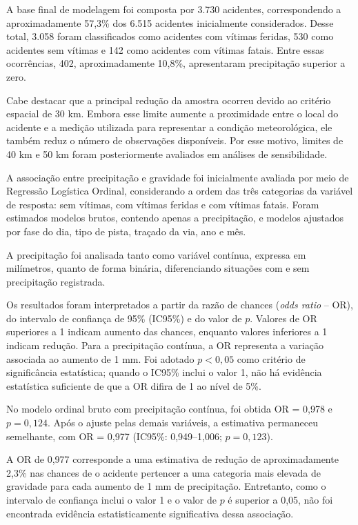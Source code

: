 \documentclass[12pt]{article}
\begin{document}
A base final de modelagem foi composta por 3.730 acidentes, correspondendo
a aproximadamente 57,3\% dos 6.515 acidentes inicialmente considerados.
Desse total, 3.058 foram classificados como acidentes com vítimas feridas,
530 como acidentes sem vítimas e 142 como acidentes com vítimas fatais.
Entre essas ocorrências, 402, aproximadamente 10,8\%, apresentaram
precipitação superior a zero.

Cabe destacar que a principal redução da amostra ocorreu devido ao critério
espacial de 30 km. Embora esse limite aumente a proximidade entre o local
do acidente e a medição utilizada para representar a condição meteorológica,
ele também reduz o número de observações disponíveis. Por esse motivo,
limites de 40 km e 50 km foram posteriormente avaliados em análises de
sensibilidade.

A associação entre precipitação e gravidade foi inicialmente avaliada por
meio de Regressão Logística Ordinal, considerando a ordem das três categorias
da variável de resposta: sem vítimas, com vítimas feridas e com vítimas
fatais. Foram estimados modelos brutos, contendo apenas a precipitação, e
modelos ajustados por fase do dia, tipo de pista, traçado da via, ano e mês.

A precipitação foi analisada tanto como variável contínua, expressa em
milímetros, quanto de forma binária, diferenciando situações com e sem
precipitação registrada.

Os resultados foram interpretados a partir da razão de chances
(\textit{odds ratio} -- OR), do intervalo de confiança de 95\% (IC95\%)
e do valor de $p$. Valores de OR superiores a 1 indicam aumento das chances,
enquanto valores inferiores a 1 indicam redução. Para a precipitação
contínua, a OR representa a variação associada ao aumento de 1 mm.
Foi adotado $p < 0,05$ como critério de significância estatística; quando
o IC95\% inclui o valor 1, não há evidência estatística suficiente de que
a OR difira de 1 ao nível de 5\%.

No modelo ordinal bruto com precipitação contínua, foi obtida OR = 0,978
e $p = 0,124$. Após o ajuste pelas demais variáveis, a estimativa permaneceu
semelhante, com OR = 0,977
(IC95\%: 0,949--1,006; $p = 0,123$).

A OR de 0,977 corresponde a uma estimativa de redução de aproximadamente
2,3\% nas chances de o acidente pertencer a uma categoria mais elevada de
gravidade para cada aumento de 1 mm de precipitação. Entretanto, como o
intervalo de confiança inclui o valor 1 e o valor de $p$ é superior a 0,05,
não foi encontrada evidência estatisticamente significativa dessa associação.
\end{document}
